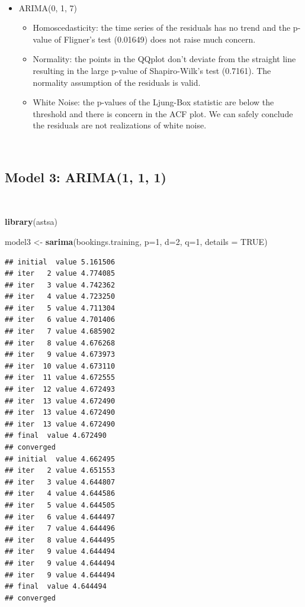 \documentclass[]{article}
\newenvironment{Shaded}{\begin{snugshade}}{\end{snugshade}}
\newcommand{\DataTypeTok}[1]{\textcolor[rgb]{0.13,0.29,0.53}{#1}}
\newcommand{\DecValTok}[1]{\textcolor[rgb]{0.00,0.00,0.81}{#1}}
\newcommand{\KeywordTok}[1]{\textcolor[rgb]{0.13,0.29,0.53}{\textbf{#1}}}
\newcommand{\NormalTok}[1]{#1}
\newcommand{\OtherTok}[1]{\textcolor[rgb]{0.56,0.35,0.01}{#1}}
\newcommand{\StringTok}[1]{\textcolor[rgb]{0.31,0.60,0.02}{#1}}
\providecommand{\tightlist}{%
  \setlength{\itemsep}{0pt}\setlength{\parskip}{0pt}}
\begin{document}
\(\;\)

\begin{itemize}
\tightlist
\item
  ARIMA(0, 1, 7)

  \begin{itemize}
  \tightlist
  \item
    Homoscedasticity: the time series of the residuals has no trend and
    the p-value of Fligner's test (0.01649) does not raise much concern.
  \item
    Normality: the points in the QQplot don't deviate from the straight
    line resulting in the large p-value of Shapiro-Wilk's test (0.7161).
    The normality assumption of the residuals is valid.
  \item
    White Noise: the p-values of the Ljung-Box statistic are below the
    threshold and there is concern in the ACF plot. We can safely
    conclude the residuals are not realizations of white noise.
  \end{itemize}
\end{itemize}

\(\;\)

\hypertarget{model-3-arima1-1-1}{%
\subsection{Model 3: ARIMA(1, 1, 1)}\label{model-3-arima1-1-1}}

\(\;\)

\begin{Shaded}
\begin{Highlighting}[]
\KeywordTok{library}\NormalTok{(astsa)}

\NormalTok{model3 <-}\StringTok{ }\KeywordTok{sarima}\NormalTok{(bookings.training, }\DataTypeTok{p=}\DecValTok{1}\NormalTok{, }\DataTypeTok{d=}\DecValTok{2}\NormalTok{, }\DataTypeTok{q=}\DecValTok{1}\NormalTok{, }\DataTypeTok{details =} \OtherTok{TRUE}\NormalTok{)}
\end{Highlighting}
\end{Shaded}

\begin{verbatim}
## initial  value 5.161506 
## iter   2 value 4.774085
## iter   3 value 4.742362
## iter   4 value 4.723250
## iter   5 value 4.711304
## iter   6 value 4.701406
## iter   7 value 4.685902
## iter   8 value 4.676268
## iter   9 value 4.673973
## iter  10 value 4.673110
## iter  11 value 4.672555
## iter  12 value 4.672493
## iter  13 value 4.672490
## iter  13 value 4.672490
## iter  13 value 4.672490
## final  value 4.672490 
## converged
## initial  value 4.662495 
## iter   2 value 4.651553
## iter   3 value 4.644807
## iter   4 value 4.644586
## iter   5 value 4.644505
## iter   6 value 4.644497
## iter   7 value 4.644496
## iter   8 value 4.644495
## iter   9 value 4.644494
## iter   9 value 4.644494
## iter   9 value 4.644494
## final  value 4.644494 
## converged
\end{verbatim}
\end{document}
